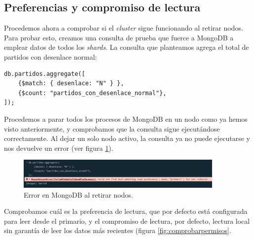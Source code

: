\subsection{Preferencias y compromiso de lectura}

Procedemos ahora a comprobar si el \textit{cluster} sigue funcionando al retirar nodos. Para probar esto, creamos una consulta de prueba que fuerce a MongoDB a emplear datos de todos los \textit{shards}. La consulta que planteamos agrega el total de partidos con desenlace normal:

\begin{verbatim}
db.partidos.aggregate([  
    {$match: { desenlace: "N" } },
    {$count: "partidos_con_desenlace_normal"},
]);
\end{verbatim}

Procedemos a parar todos los procesos de MongoDB en un nodo como ya hemos visto anteriormente, y comprobamos que la consulta sigue ejecutándose correctamente. Al dejar un solo nodo activo, la consulta ya no puede ejecutarse y nos devuelve un error (ver figura \ref{fig:error_mongoD}).

\begin{figure}[H]
\centering
\includegraphics[width=0.9\textwidth]{fotos/mongo/1_node_Error.png}
\caption{Error en MongoDB al retirar nodos.}
\label{fig:error_mongoD}
\end{figure}

Comprobamos cuál es la preferencia de lectura, que por defecto está configurada para leer desde el primario, y el compromiso de lectura, por defecto, lectura local sin garantía de leer los datos más recientes (figura \ref{fig:comprobarpermisos}.

